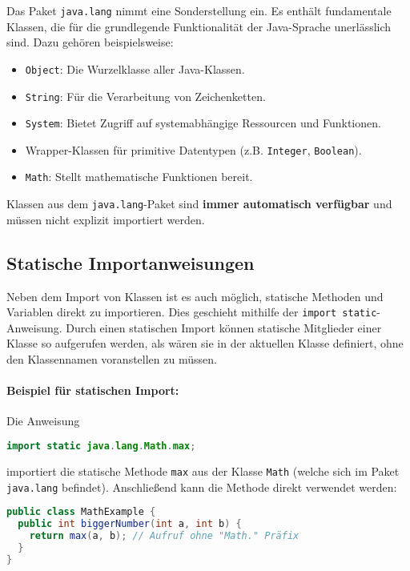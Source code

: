 Das Paket \texttt{java.lang} nimmt eine Sonderstellung ein. Es enthält fundamentale Klassen, die für die grundlegende 
Funktionalität der Java-Sprache unerlässlich sind. Dazu gehören beispielsweise:
\begin{itemize}
    \item \texttt{Object}: Die Wurzelklasse aller Java-Klassen.
    \item \texttt{String}: Für die Verarbeitung von Zeichenketten.
    \item \texttt{System}: Bietet Zugriff auf systemabhängige Ressourcen und Funktionen.
    \item Wrapper-Klassen für primitive Datentypen (z.B. \texttt{Integer}, \texttt{Boolean}).
    \item \texttt{Math}: Stellt mathematische Funktionen bereit.
\end{itemize}
Klassen aus dem \texttt{java.lang}-Paket sind \textbf{immer automatisch verfügbar} und müssen nicht explizit importiert werden.

\subsection{Statische Importanweisungen}
\label{ssec:statische_importe}

Neben dem Import von Klassen ist es auch möglich, statische Methoden und Variablen direkt zu importieren. 
Dies geschieht mithilfe der \texttt{import static}-Anweisung.
Durch einen statischen Import können statische Mitglieder einer Klasse so aufgerufen werden, als wären sie 
in der aktuellen Klasse definiert, ohne den Klassennamen voranstellen zu müssen.

\paragraph{Beispiel für statischen Import:}
Die Anweisung
\begin{lstlisting}[language=Java, caption={Statischer Import der max-Methode}]
import static java.lang.Math.max;
\end{lstlisting}
importiert die statische Methode \texttt{max} aus der Klasse \texttt{Math} (welche sich im Paket \texttt{java.lang} befindet).
Anschließend kann die Methode direkt verwendet werden:
\begin{lstlisting}[language=Java, caption={Verwendung nach statischem Import}]
public class MathExample {
  public int biggerNumber(int a, int b) {
    return max(a, b); // Aufruf ohne "Math." Präfix
  }
}
\end{lstlisting}

